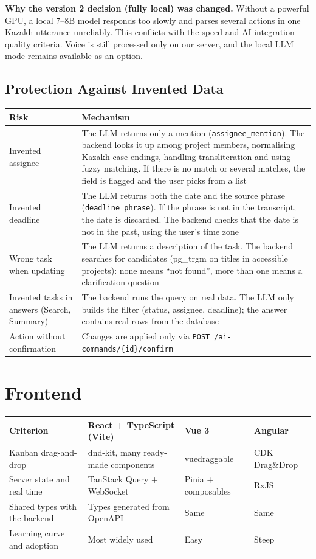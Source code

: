 \documentclass[11pt,a4paper]{article}
\newcommand{\tblstart}{\small\rowcolors{2}{gray!7}{white}}
\newcommand{\code}[1]{\texttt{#1}}
\begin{document}
\textbf{Why the version 2 decision (fully local) was changed.} Without a powerful GPU, a local 7--8B model responds too slowly and parses several actions in one Kazakh utterance unreliably. This conflicts with the speed and AI-integration-quality criteria. Voice is still processed only on our server, and the local LLM mode remains available as an option.

\subsection{Protection Against Invented Data}

{\tblstart
\begin{xltabular}{\textwidth}{P{4cm} L}
\toprule
\textbf{Risk} & \textbf{Mechanism} \\
\midrule
\endhead
Invented assignee & The LLM returns only a mention (\code{assignee\_mention}). The backend looks it up among project members, normalising Kazakh case endings, handling transliteration and using fuzzy matching. If there is no match or several matches, the field is flagged and the user picks from a list \\
Invented deadline & The LLM returns both the date and the source phrase (\code{deadline\_phrase}). If the phrase is not in the transcript, the date is discarded. The backend checks that the date is not in the past, using the user's time zone \\
Wrong task when updating & The LLM returns a description of the task. The backend searches for candidates (pg\_trgm on titles in accessible projects): none means ``not found'', more than one means a clarification question \\
Invented tasks in answers (Search, Summary) & The backend runs the query on real data. The LLM only builds the filter (status, assignee, deadline); the answer contains real rows from the database \\
Action without confirmation & Changes are applied only via \code{POST /ai-commands/\{id\}/confirm} \\
\bottomrule
\end{xltabular}}

\section{Frontend}

{\tblstart
\begin{xltabular}{\textwidth}{P{3.6cm} L L L}
\toprule
\textbf{Criterion} & \textbf{React + TypeScript (Vite)} & \textbf{Vue 3} & \textbf{Angular} \\
\midrule
\endhead
Kanban drag-and-drop & dnd-kit, many ready-made components & vuedraggable & CDK Drag\&Drop \\
Server state and real time & TanStack Query + WebSocket & Pinia + composables & RxJS \\
Shared types with the backend & Types generated from OpenAPI & Same & Same \\
Learning curve and adoption & Most widely used & Easy & Steep \\
\bottomrule
\end{xltabular}}
\end{document}
